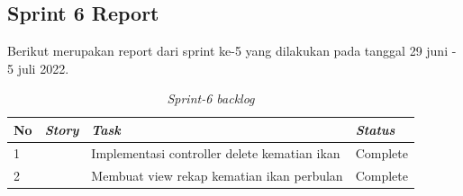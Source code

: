 
\subsection{Sprint 6 Report}
Berikut merupakan report dari sprint ke-5 yang dilakukan pada tanggal 29 juni - 5 juli 2022.

\begin{table}[H]
	\caption{\textit{Sprint-6 backlog}}
	\label{sprint6_backlog}
	\begin{tabular}{@{} |p{0.5cm}|p{5cm}|p{5cm}|p{2cm}| @{}}
		\hline
		\textbf{No} & \textbf{\textit{Story}} & \textbf{\textit{Task}} & \textbf{\textit{Status}} \\
		\hline
		1 & & Implementasi controller delete kematian ikan & Complete\\
		\cline{1-1}\cline{3-4}
		2 & & Membuat view rekap kematian ikan perbulan & Complete\\
		\cline{1-1}\cline{3-4}
		\hline
	\end{tabular}
\end{table}

